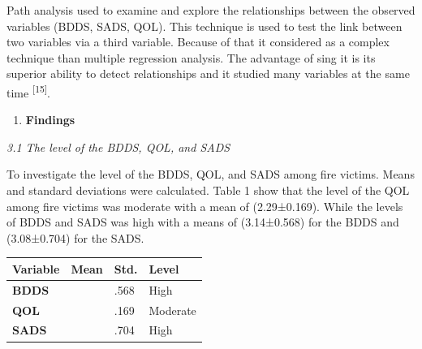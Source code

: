 \documentclass[
]{article}
\newcounter{none} %
\begin{document}
Path analysis used to examine and explore the relationships between the
observed variables (BDDS, SADS, QOL). This technique is used to test the
link between two variables via a third variable. Because of that it
considered as a complex technique than multiple regression analysis. The
advantage of sing it is its superior ability to detect relationships and
it studied many variables at the same time \textsuperscript{{[}15{]}}.

\begin{enumerate}
\def\labelenumi{\arabic{enumi}.}
\setcounter{enumi}{2}
\item
  \textbf{Findings}
\end{enumerate}

\emph{3.1 The level of the BDDS, QOL, and SADS}

To investigate the level of the BDDS, QOL, and SADS among fire victims.
Means and standard deviations were calculated. Table 1 show that the
level of the QOL among fire victims was moderate with a mean of
(2.29±0.169). While the levels of BDDS and SADS was high with a means of
(3.14±0.568) for the BDDS and (3.08±0.704) for the SADS.

{\def\LTcaptype{none} %
\begin{longtable}[]{@{}
  >{\centering\arraybackslash}p{}
  >{\centering\arraybackslash}p{}
  >{\centering\arraybackslash}p{}
  >{\centering\arraybackslash}p{}@{}}
\toprule\noalign{}
\begin{minipage}[b]{\linewidth}\centering
\textbf{Variable}
\end{minipage} & \begin{minipage}[b]{\linewidth}\centering
\textbf{Mean}
\end{minipage} & \begin{minipage}[b]{\linewidth}\centering
\textbf{Std.}
\end{minipage} & \begin{minipage}[b]{\linewidth}\centering
\textbf{Level}
\end{minipage} \\
\midrule\noalign{}
\endhead
\bottomrule\noalign{}
\endlastfoot
\textbf{BDDS} & 3.14 & .568 & High \\
\textbf{QOL} & 2.29 & .169 & Moderate \\
\textbf{SADS} & 3.08 & .704 & High \\
\end{longtable}
}
\end{document}
